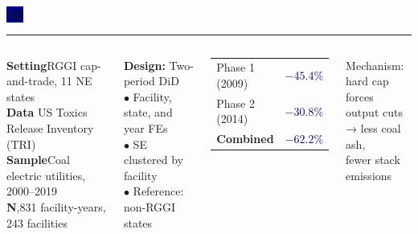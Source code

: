 \documentclass[aspectratio=169,12pt]{beamer}
\newcommand{\badge}[2][Navy]{%
  \colorbox{#1}{\color{white}\,\textbf{\small #2}\,}%
}
\newcommand{\hi}[1]{\textcolor{Navy}{\textbf{#1}}}
\begin{document}
\begin{frame}
\badge{02}
\vspace{0.5em}\par
{\color{Blue}\rule{\linewidth}{0.8pt}}\par
\vspace{0.5em}

\begin{columns}[T]
\textbf{Setting}\quad RGGI cap-and-trade, 11 NE states\\
\textbf{Data}\quad\; US Toxics Release Inventory (TRI)\\
\textbf{Sample}\quad Coal electric utilities, 2000--2019\\
\textbf{N}\quad\quad{},831 facility-years, 243 facilities

\vspace{0.5em}
{\small\textbf{Design:} Two-period DiD\\
$\bullet$ Facility, state, and year FEs\\
$\bullet$ SE clustered by facility\\
$\bullet$ Reference: non-RGGI states}

\begin{tcolorbox}[resultbox, title={\small Results}]
\begin{tabular}{lc}
Phase 1 (2009) & \hi{$-45.4\%$} \\
Phase 2 (2014) & \hi{$-30.8\%$} \\
\midrule
\textbf{Combined} & \hi{$-62.2\%$} \\
\end{tabular}
\end{tcolorbox}

\vspace{0.4em}
{\small Mechanism: hard cap forces\\
output cuts → less coal ash,\\
fewer stack emissions}
\end{columns}
\end{frame}
\end{document}
